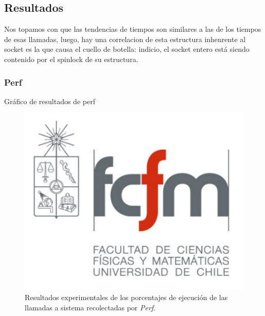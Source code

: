 \subsection{Resultados}
Nos topamos con que las tendencias de tiempos son similares a las de los tiempos de esas llamadas, luego, hay una correlacion de esta estructura inhenrente al socket es la que causa el cuello de botella: indicio, el socket entero está siendo contenido por el spinlock de su estructura.

\subsubsection{Perf}
Gráfico de resultados de perf
\begin{figure}[!h]
	\centering
	\includegraphics[scale=.5]{imagenes/fcfm}
	\caption{Resultados experimentales de los porcentajes de ejecución de las llamadas a sistema recolectadas por \emph{Perf}.}
	\label{fig:resPerf}
\end{figure}

